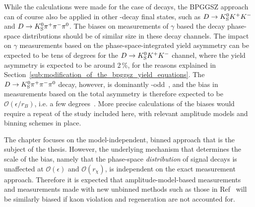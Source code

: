 While the calculations were made for the case of \DtoKspipi decays, the BPGGSZ approach can of course also be applied in other \D-decay final states, such as ${{D}\rightarrow{\ensuremath{{K}^0_{\mathrm{S}}}}{\ensuremath{{K}^+}}{\ensuremath{{K}^-}}}$ and ${D}\rightarrow{\ensuremath{{K}^0_{\mathrm{S}}}}{\ensuremath{{\pi}^+}}{\ensuremath{{\pi}^-}}{\ensuremath{{\pi}^0}}$. The biases on measurements of $\gamma$ based the \D decay phase-space distributions should be of similar size in these decay channels. The impact on $\gamma$ measurements based on the phase-space-integrated yield asymmetry can be expected to be tens of degrees for the ${D}\rightarrow{\ensuremath{{K}^0_{\mathrm{S}}}}{\ensuremath{{K}^+}}{\ensuremath{{K}^-}}$ channel, where the yield asymmetry is expected to be around 2\,\%, for the reasons explained in Section~\ref{sub:modification_of_the_bpggsz_yield_equations}. The ${D}\rightarrow{\ensuremath{{K}^0_{\mathrm{S}}}}{\ensuremath{{\pi}^+}}{\ensuremath{{\pi}^-}}{\ensuremath{{\pi}^0}}$ decay, however, is dominantly \CP-odd~\cite{CLEOKSpipipi0}, and the bias in measurements based on the total asymmetry is therefore expected to be $\mathcal O(\epsilon/r_B)$, i.e. a few degrees~\cite{grossmanEffectsBarMixing2014}. More precise calculations of the biases would require a repeat of the study included here, with relevant amplitude models and binning schemes in place.



The chapter focuses on the model-independent, binned approach that is the subject of the thesis. However, the underlying mechanism that determines the scale of the bias, namely that the phase-space \emph{distribution} of signal decays is unaffected at $\mathcal O(\epsilon)$ and $\mathcal O(r_\chi)$, is independent on the exact measurement approach. Therefore it is expected that amplitude-model-based measurements and measurements made with new unbinned methods such as those in Ref~\cite{poluektovUnbinnedModelindependentMeasurements2018} will be similarly biased if kaon \CP violation and regeneration are not accounted for. 




